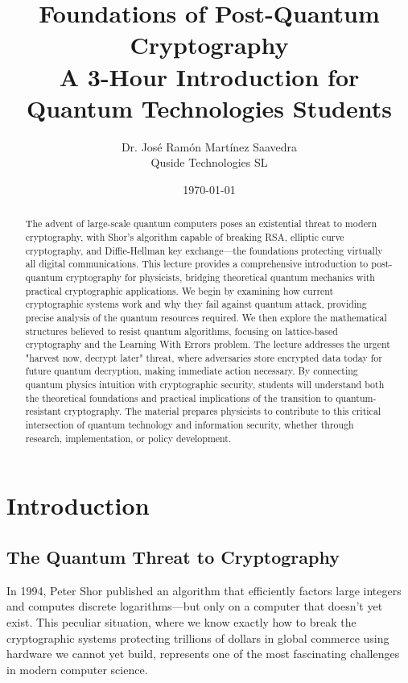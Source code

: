 \documentclass[11pt,a4paper]{article}
\title{Foundations of Post-Quantum Cryptography\\
\large{A 3-Hour Introduction for Quantum Technologies Students}}
\author{Dr. José Ramón Martínez Saavedra\\
Quside Technologies SL}
\date{\today}
\begin{document}
\maketitle

\begin{abstract}
The advent of large-scale quantum computers poses an existential threat to modern cryptography, with Shor's algorithm capable of breaking RSA, elliptic curve cryptography, and Diffie-Hellman key exchange—the foundations protecting virtually all digital communications. This lecture provides a comprehensive introduction to post-quantum cryptography for physicists, bridging theoretical quantum mechanics with practical cryptographic applications. We begin by examining how current cryptographic systems work and why they fail against quantum attack, providing precise analysis of the quantum resources required. We then explore the mathematical structures believed to resist quantum algorithms, focusing on lattice-based cryptography and the Learning With Errors problem. The lecture addresses the urgent "harvest now, decrypt later" threat, where adversaries store encrypted data today for future quantum decryption, making immediate action necessary. By connecting quantum physics intuition with cryptographic security, students will understand both the theoretical foundations and practical implications of the transition to quantum-resistant cryptography. The material prepares physicists to contribute to this critical intersection of quantum technology and information security, whether through research, implementation, or policy development.
\end{abstract}

\tableofcontents
\newpage
\section{Introduction}
\label{sec:intro}

\subsection{The Quantum Threat to Cryptography}

In 1994, Peter Shor published an algorithm that efficiently factors large integers and computes discrete logarithms---but only on a computer that doesn't yet exist. This peculiar situation, where we know exactly how to break the cryptographic systems protecting trillions of dollars in global commerce using hardware we cannot yet build, represents one of the most fascinating challenges in modern computer science.
\end{document}
